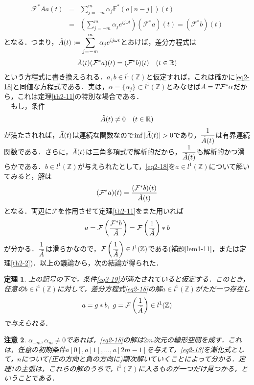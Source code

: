\documentclass[a4j]{jsbook}
\newtheorem{theorem}{定理}
\newtheorem{rem}[theorem]{注意}
\numberwithin{theorem}{chapter}  %
\begin{document}
\begin{eqnarray*}
\mathcal{F}^* Aa(t)&=&\sum_{j=-m}^m \alpha_j\mathbb{F}^*(a[n-j])(t) \\
&=&\left(\sum_{j=-m}^m \alpha_je^{ij\omega t}\right)(\mathcal{F}^* a)(t)=(\mathcal{F}^* b)(t)
\end{eqnarray*}
となる．つまり，\(\displaystyle\Tilde{A}(t):=\sum_{j=-m}^m \alpha_je^{ij\omega t}\)とおけば，差分方程式は
\begin{equation*}
    \Tilde{A}(t)(\mathcal{F}^* a)(t)=(\mathcal{F}^* b)(t)\quad (t\in\mathbb{R})
\end{equation*}
という方程式に書き換えられる．\(a, b\in l^1(\mathbb{Z})\)と仮定すれば，これは確かに\eqref{eq2-18}と同値な方程式である．実は，\(\alpha=\{\alpha_j\}\subset l^1(\mathbb{Z})\)とみなせば\(\Tilde{A}=T\mathcal{F}^*\alpha\)だから，これは定理\ref{th2-11}の特別な場合である．\\
　もし，条件
\begin{equation}
    \Tilde{A}(t)\neq 0\quad (t\in\mathbb{R}) \label{eq2-19}
\end{equation}
が満たされれば，\(\Tilde{A}(t)\)は連続な関数なので\(\inf|\Tilde{A}(t)|>0\)であり，\(\displaystyle\frac{1}{\Tilde{A}(t)}\)は有界連続関数である．さらに，\(\Tilde{A}(t)\)は三角多項式で解析的だから，\(\displaystyle\frac{1}{\Tilde{A}(t)}\)も解析的かつ滑らかである．\(b\in l^1(\mathbb{Z})\)が与えられたとして，\eqref{eq2-18}を\(a\in l^1(\mathbb{Z})\)について解いてみると，解は
\begin{equation*}
    (\mathcal{F}^* a)(t)=\frac{(\mathcal{F}^* b)(t)}{\Tilde{A}(t)}
\end{equation*}
となる．両辺に\(\mathcal{F}\)を作用させて定理\ref{th2-11}をまた用いれば
\begin{equation*}
    a=\mathcal{F}\left(\frac{\mathcal{F}^* b}{\Tilde{A}}\right)=\mathcal{F}\left(\frac{1}{\Tilde{A}}\right)*b
\end{equation*}
が分かる．\(\displaystyle\frac{1}{\Tilde{A}}\)は滑らかなので，\(\displaystyle\mathcal{F}\left(\frac{1}{\Tilde{A}}\right)\in l^1(\mathbb{Z})\)である(補題\ref{lem1-11}，または定理\ref{th2-2})．以上の議論から，次の結論が得られた．
\begin{theorem}
\label{th2-15}
上の記号の下で，条件\eqref{eq2-19}が満たされていると仮定する．このとき，任意の\(b\in l^1(\mathbb{Z})\)に対して，差分方程式\eqref{eq2-18}の解\(a\in l^1(\mathbb{Z})\)がただ一つ存在し
\begin{equation}
    a=g*b,\ g=\mathcal{F}\left(\frac{1}{\Tilde{A}}\right)\in l^1(\mathbb{Z}) \label{eq2-20}
\end{equation}
で与えられる．
\end{theorem}
\begin{rem}
\label{rem2-1}
\(\alpha_{-m}, \alpha_m\neq 0\)であれば，\eqref{eq2-18}の解は\(2m\)次元の線形空間を成す．これは，任意の初期条件\(a[0], a[1], \dots, a[2m-1]\)を与えて，\eqref{eq2-18}を漸化式として，\(n\)について(正の方向と負の方向に)順次解いていくことによって分かる．定理\ref{th2-15}の主張は，これらの解のうちで，\(l^1(\mathbb{Z})\)に入るものが一つだけ見つかる，ということである．
\end{rem}
\end{document}
